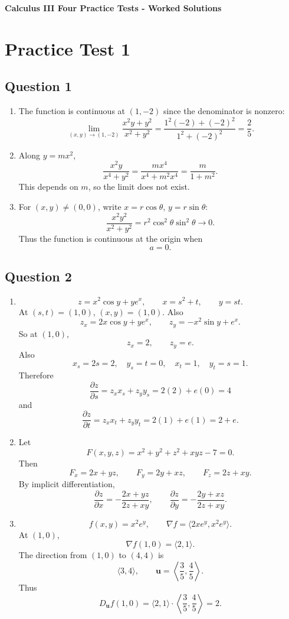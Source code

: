 \documentclass[11pt]{article}
\begin{document}
\begin{center}
{\Large \textbf{Calculus III Four Practice Tests - Worked Solutions}}
\end{center}

\section*{Practice Test 1}

\subsection*{Question 1}
\begin{enumerate}[label=\alph*)]
\item
The function is continuous at $(1,-2)$ since the denominator is nonzero:
\[
\lim_{(x,y)\to(1,-2)}\frac{x^2y+y^2}{x^2+y^2}
=\frac{1^2(-2)+(-2)^2}{1^2+(-2)^2}
=\frac{2}{5}.
\]

\item
Along $y=mx^2$,
\[
\frac{x^2y}{x^4+y^2}
=\frac{mx^4}{x^4+m^2x^4}
=\frac{m}{1+m^2}.
\]
This depends on $m$, so the limit does not exist.

\item
For $(x,y)\ne(0,0)$, write $x=r\cos\theta$, $y=r\sin\theta$:
\[
\frac{x^2y^2}{x^2+y^2}
=r^2\cos^2\theta\sin^2\theta \to 0.
\]
Thus the function is continuous at the origin when
\[
\boxed{a=0}.
\]
\end{enumerate}

\subsection*{Question 2}
\begin{enumerate}[label=\alph*)]
\item
\[
z=x^2\cos y+ye^x,\qquad x=s^2+t,\qquad y=st.
\]
At $(s,t)=(1,0)$, $(x,y)=(1,0)$. Also
\[
z_x=2x\cos y+ye^x,\qquad z_y=-x^2\sin y+e^x.
\]
So at $(1,0)$,
\[
z_x=2,\qquad z_y=e.
\]
Also
\[
x_s=2s=2,\quad y_s=t=0,\quad x_t=1,\quad y_t=s=1.
\]
Therefore
\[
\boxed{\frac{\partial z}{\partial s}=z_xx_s+z_yy_s=2(2)+e(0)=4}
\]
and
\[
\boxed{\frac{\partial z}{\partial t}=z_xx_t+z_yy_t=2(1)+e(1)=2+e}.
\]

\item
Let
\[
F(x,y,z)=x^2+y^2+z^2+xyz-7=0.
\]
Then
\[
F_x=2x+yz,\qquad F_y=2y+xz,\qquad F_z=2z+xy.
\]
By implicit differentiation,
\[
\boxed{\frac{\partial z}{\partial x}=-\frac{2x+yz}{2z+xy}},
\qquad
\boxed{\frac{\partial z}{\partial y}=-\frac{2y+xz}{2z+xy}}.
\]

\item
\[
f(x,y)=x^2e^y,\qquad \nabla f=\langle 2xe^y,x^2e^y\rangle.
\]
At $(1,0)$,
\[
\nabla f(1,0)=\langle 2,1\rangle.
\]
The direction from $(1,0)$ to $(4,4)$ is
\[
\langle 3,4\rangle,\qquad \mathbf u=\left\langle \frac35,\frac45\right\rangle.
\]
Thus
\[
D_{\mathbf u}f(1,0)=\langle 2,1\rangle\cdot \left\langle \frac35,\frac45\right\rangle
=\boxed{2}.
\]
\end{enumerate}
\end{document}
